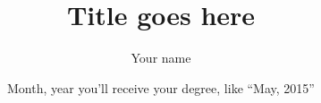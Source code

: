 


\title{Title goes here}
\author{Your name}
\date{Month, year you'll receive your degree, like ``May, 2015''} %

\frontmatter




\maketitle
{} %
\tableofcontents
\listoffigures %
\listoftables %